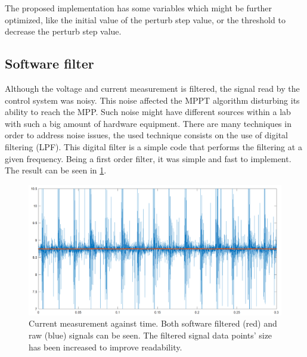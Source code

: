 The proposed implementation has some variables which might be further optimized, like the initial value of the perturb step value, or the threshold to decrease the perturb step value. 


\subsection{Software filter}
Although the voltage and current measurement is filtered, the signal read by the control system was noisy. This noise affected the MPPT algorithm disturbing its ability to reach the MPP. Such noise might have different sources within a lab with such a big amount of hardware equipment. There are many techniques in order to address noise issues, the used technique consists on the use of digital filtering (LPF). This digital filter is a  simple code that performs the filtering at a given frequency. Being a first order filter, it was simple and fast to implement. The result can be seen in \ref{software_filter}.

\begin{figure}[htbp]
	\begin{center}
		\includegraphics[width=\textwidth]{../Pictures/P1/Discussion/sw_filter_current.png}
		\caption{Current measurement against time. Both software filtered (red) and raw (blue) signals can be seen. The filtered signal data points' size has been increased to improve readability.}
		\label{software_filter}
	\end{center}	
\end{figure}









